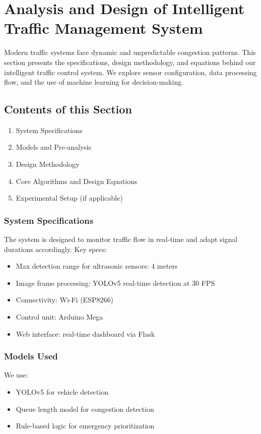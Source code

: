 \documentclass[12pt]{report}
\begin{document}
\chapter{Analysis and Design of Intelligent Traffic Management System}
Modern traffic systems face dynamic and unpredictable congestion patterns. This section presents the specifications, design methodology, and equations behind our intelligent traffic control system. We explore sensor configuration, data processing flow, and the use of machine learning for decision-making.

\section{Contents of this Section}
\begin{enumerate}
\item System Specifications
\item Models and Pre-analysis
\item Design Methodology
\item Core Algorithms and Design Equations
\item Experimental Setup (if applicable)
\end{enumerate}

\subsection{System Specifications}
The system is designed to monitor traffic flow in real-time and adapt signal durations accordingly. Key specs:
\begin{itemize}
\item Max detection range for ultrasonic sensors: 4 meters
\item Image frame processing: YOLOv5 real-time detection at 30 FPS
\item Connectivity: Wi-Fi (ESP8266)
\item Control unit: Arduino Mega
\item Web interface: real-time dashboard via Flask
\end{itemize}

\subsection{Models Used}
We use:
\begin{itemize}
\item YOLOv5 for vehicle detection
\item Queue length model for congestion detection
\item Rule-based logic for emergency prioritization
\end{itemize}
\end{document}
